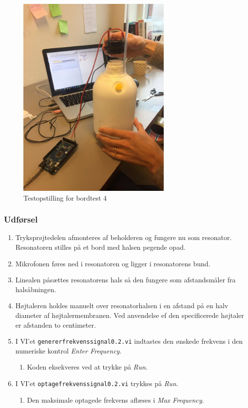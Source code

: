 		\begin{figure}[htb]
			\centering
				\includegraphics[width=3in]{bordtest4}
				\caption{Testopstilling for bordtest 4}	
				\label{fig:bt4}
			\end{figure}
		

		
		\subsubsection{Udførsel}
			
			\begin{enumerate}
				\item Tryksprøjtedelen afmonteres af beholderen og fungere nu som resonator. Resonatoren stilles på et bord med halsen pegende opad. 
				\item Mikrofonen føres ned i resonatoren og ligger i resonatorens bund. 
				\item Linealen påsættes resonatorens hals så den fungere som afstandsmåler fra halsåbningen.
				\item Højtaleren holdes manuelt over resonatorhalsen i en afstand på en halv diameter af højtalermembranen. Ved anvendelse ef den specificerede højtaler er afstanden to centimeter. 
				\item I VI'et \texttt{genererfrekvenssignal0.2.vi} indtastes den ønskede frekvens i den numeriske kontrol \textit{Enter Frequency}. 
					\begin{enumerate}
						\item Koden eksekveres ved at trykke på \textit{Run}. 
					\end{enumerate} 
				\item I VI'et \texttt{optagefrekvenssignal0.2.vi} trykkes på \textit{Run}. 
					\begin{enumerate}
						\item Den maksimale optagede frekvens aflæses i \textit{Max Frequency}. 
					\end{enumerate}	 	
			\end{enumerate}
			
